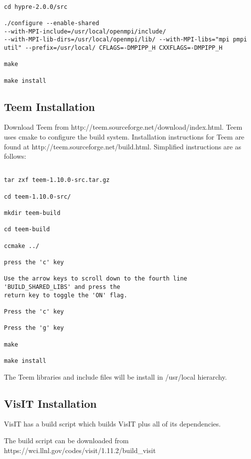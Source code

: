\begin{Verbatim}

cd hypre-2.0.0/src

./configure --enable-shared
--with-MPI-include=/usr/local/openmpi/include/
--with-MPI-lib-dirs=/usr/local/openmpi/lib/ --with-MPI-libs="mpi pmpi
util" --prefix=/usr/local/ CFLAGS=-DMPIPP_H CXXFLAGS=-DMPIPP_H

make

make install

\end{Verbatim}

 

\subsection{Teem Installation}

Download Teem from http://teem.sourceforge.net/download/index.html.  Teem uses cmake to configure the build system. Installation instructions for Teem are found at http://teem.sourceforge.net/build.html.  Simplified instructions are as follows:

\begin{verbatim}

tar zxf teem-1.10.0-src.tar.gz

cd teem-1.10.0-src/

mkdir teem-build

cd teem-build

ccmake ../

press the 'c' key

Use the arrow keys to scroll down to the fourth line 'BUILD_SHARED_LIBS' and press the 
return key to toggle the 'ON' flag.

Press the 'c' key

Press the 'g' key

make

make install

\end{verbatim}

The Teem libraries and include files will be install in /usr/local hierarchy.


\subsection{VisIT Installation}
VisIT has a build script which builds VisIT plus all of its dependencies.

The build script can be downloaded from
https://wci.llnl.gov/codes/visit/1.11.2/build_visit

